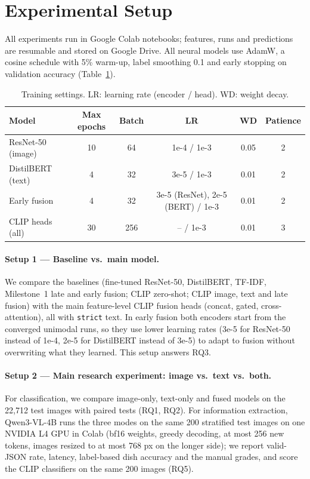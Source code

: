 \documentclass[11pt,a4paper]{article}
\begin{document}
\section{Experimental Setup}

All experiments run in Google Colab notebooks; features, runs and predictions are resumable and stored on Google
Drive. All neural models use AdamW, a cosine schedule with 5\% warm-up, label smoothing 0.1 and early stopping on
validation accuracy (Table~\ref{tab:hparams}).

\begin{table}[!htbp]
\centering
\caption{Training settings. LR: learning rate (encoder / head). WD: weight decay.}
\label{tab:hparams}
\small
\begin{tabular}{lccccc}
\toprule
Model & Max epochs & Batch & LR & WD & Patience \\
\midrule
ResNet-50 (image) & 10 & 64 & 1e-4 / 1e-3 & 0.05 & 2 \\
DistilBERT (text) & 4 & 32 & 3e-5 / 1e-3 & 0.01 & 2 \\
Early fusion & 4 & 32 & 3e-5 (ResNet), 2e-5 (BERT) / 1e-3 & 0.01 & 2 \\
CLIP heads (all) & 30 & 256 & -- / 1e-3 & 0.01 & 3 \\
\bottomrule
\end{tabular}
\end{table}

\paragraph{Setup 1 --- Baseline vs.\ main model.}
We compare the baselines (fine-tuned ResNet-50, DistilBERT, TF-IDF, Milestone~1 late and early fusion; CLIP
zero-shot; CLIP image, text and late fusion) with the main feature-level CLIP fusion heads (concat, gated,
cross-attention), all with \texttt{strict} text. In early fusion both encoders start from the converged unimodal
runs, so they use lower learning rates (3e-5 for ResNet-50 instead of 1e-4, 2e-5 for DistilBERT instead of 3e-5) to
adapt to fusion without overwriting what they learned. This setup answers RQ3.

\paragraph{Setup 2 --- Main research experiment: image vs.\ text vs.\ both.}
For classification, we compare image-only, text-only and fused models on the 22,712 test images with paired tests
(RQ1, RQ2). For information extraction, Qwen3-VL-4B runs the three modes on the same 200 stratified test images on
one NVIDIA L4 GPU in Colab (bf16 weights, greedy decoding, at most 256 new tokens, images resized to at most 768 px
on the longer side); we report valid-JSON rate, latency, label-based dish accuracy and the manual grades, and score
the CLIP classifiers on the same 200 images (RQ5).
\end{document}
